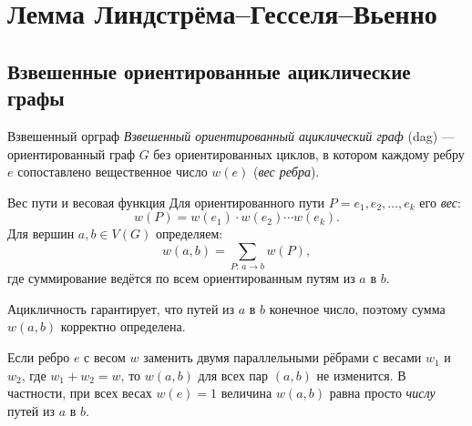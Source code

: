 
\section{Лемма Линдстрёма–Гесселя–Вьенно}

\subsection{Взвешенные ориентированные ациклические графы}

\begin{Definition}{Взвешенный орграф}{}
	\emph{Взвешенный ориентированный ациклический граф} (dag) — ориентированный граф $G$ без ориентированных циклов, в котором каждому ребру $e$ сопоставлено вещественное число $w(e)$ (\emph{вес ребра}).
\end{Definition}

\begin{Definition}{Вес пути и весовая функция}{}
	Для ориентированного пути $P = e_1, e_2, \ldots, e_k$ его \emph{вес}:
	\[
	w(P) = w(e_1)\cdot w(e_2) \cdots w(e_k).
	\]
	Для вершин $a, b \in V(G)$ определяем:
	\[
	w(a,b) = \sum_{P:\,a \to b} w(P),
	\]
	где суммирование ведётся по всем ориентированным путям из $a$ в $b$.
\end{Definition}

\begin{Remark}{}{}
	Ацикличность гарантирует, что путей из $a$ в $b$ конечное число, поэтому сумма $w(a,b)$ корректно определена.
\end{Remark}

\begin{Remark}{}{}
	Если ребро $e$ с весом $w$ заменить двумя параллельными рёбрами с весами $w_1$ и $w_2$,
	где $w_1 + w_2 = w$, то $w(a,b)$ для всех пар $(a,b)$ не изменится. В частности, при всех весах $w(e)=1$ величина $w(a,b)$ равна просто \emph{числу} путей из $a$ в $b$.
\end{Remark}

